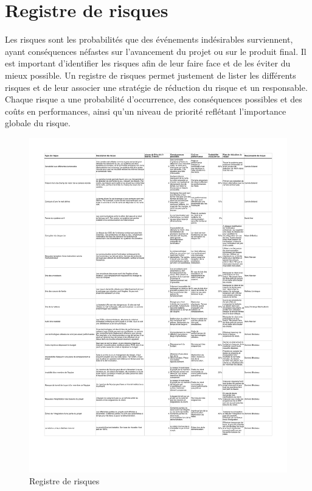 \chapter{Registre de risques}

Les risques sont les probabilités que des événements indésirables surviennent, ayant conséquences néfastes sur l'avancement du projet ou sur le produit final.
Il est important d'identifier les risques afin de leur faire face et de les éviter du mieux possible.
Un registre de risques permet justement de lister les différents risques et de leur associer une stratégie de réduction du risque et un responsable.
Chaque risque a une probabilité d'occurrence, des conséquences possibles et des coûts en performances, ainsi qu'un niveau de priorité reflétant l'importance globale du risque.

\begin{figure}
  \centering
  \caption{Registre de risques}
  \includegraphics[scale=0.80, angle=0]{resources/risques.pdf}
\end{figure}
